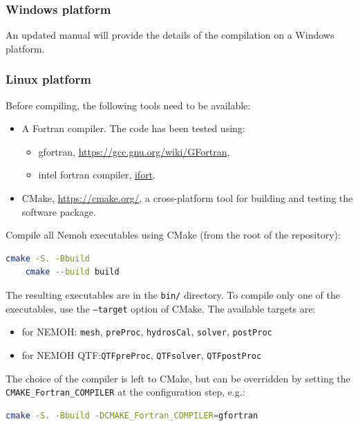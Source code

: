 \documentclass[12pt,a4paper,titlepage]{article}
\begin{document}
\subsubsection{Windows platform}
An updated manual will provide the details of the compilation on a Windows platform.

\subsubsection{Linux platform}
Before compiling, the following tools need to be available:
\begin{itemize}
    \item A Fortran compiler. The code has been tested using:
    \begin{itemize}
        \item gfortran, \url{https://gcc.gnu.org/wiki/GFortran},
        \item intel fortran compiler, \href{https://www.intel.com/content/www/us/en/developer/tools/oneapi/fortran-compiler.html#gs.jik1s6}{ifort}.
    \end{itemize}
    \item CMake, \url{https://cmake.org/}, a cross-platform tool for building and testing the software package.
\end{itemize}

\noindent
Compile all Nemoh executables using CMake (from the root of the repository):
\begin{lstlisting}[language=bash,keywordstyle=\color{blue},basicstyle=\ttfamily\footnotesize,backgroundcolor=\color{lightgray}]
    cmake -S. -Bbuild
    cmake --build build
\end{lstlisting}
The resulting executables are in the \texttt{bin/} directory. To compile only one of the executables, use the \texttt{--target} option of CMake. The available targets are:
\begin{itemize}
    \item for NEMOH: \texttt{{mesh}}, \texttt{{preProc}}, \texttt{{hydrosCal}}, \texttt{{solver}}, \texttt{{postProc}}
    \item for NEMOH QTF:\texttt{{QTFpreProc}}, \texttt{{QTFsolver}}, \texttt{{QTFpostProc}}
\end{itemize}

The choice of the compiler is left to CMake, but can be overridden by setting the \texttt{CMAKE\_Fortran\_COMPILER} at the configuration step, e.g.:
\begin{lstlisting}[language=bash,keywordstyle=\color{blue},basicstyle=\ttfamily\footnotesize,backgroundcolor=\color{lightgray}]
    cmake -S. -Bbuild -DCMAKE_Fortran_COMPILER=gfortran
\end{lstlisting}
\vspace*{5mm}
\end{document}
